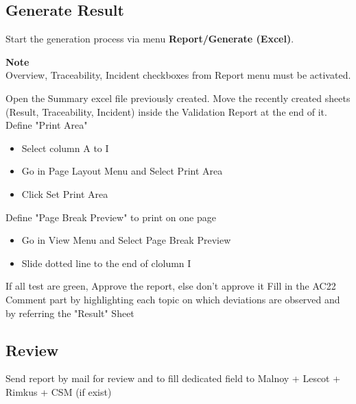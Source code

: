 \subsection{Generate Result}
Start the generation process via menu \textbf{Report/Generate (Excel)}.
 \begin{tcolorbox}[colframe=white!100!black, sharp corners=all]
 \textbf{Note}\\
Overview, Traceability, Incident checkboxes from Report menu must be activated.
\end{tcolorbox}
Open the Summary excel file previously created.\newline
Move the recently created sheets (Result, Traceability, Incident) inside the Validation Report at the end of it.\newline
\newline
Define "Print Area"
\begin{itemize} 
	\item Select column A to I
	\item Go in Page Layout Menu and Select Print Area
	\item Click Set Print Area
\end{itemize} 
Define "Page Break Preview" to print on one page
\begin{itemize} 
	\item Go in View Menu and Select Page Break Preview
	\item Slide dotted line to the end of clolumn I
\end{itemize} 

If all test are green, Approve the report, else don't approve it\newline
\newline
Fill in the AC22 Comment part by highlighting each topic on which deviations are observed and by referring the "Result" Sheet\newline
\newline








\subsection{Review}
Send report by mail for review and to fill dedicated field to Malnoy + Lescot + Rimkus + CSM (if exist)








